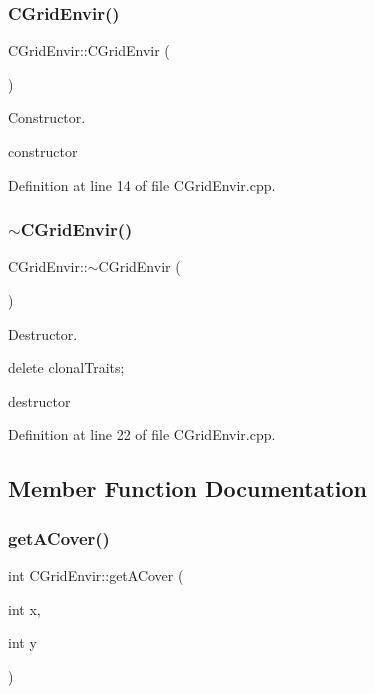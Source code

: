 \subsubsection{\texorpdfstring{CGridEnvir()}{CGridEnvir()}}
{\footnotesize\ttfamily C\+Grid\+Envir\+::\+C\+Grid\+Envir (\begin{DoxyParamCaption}{ }\end{DoxyParamCaption})}



Constructor. 

constructor 

Definition at line 14 of file C\+Grid\+Envir.\+cpp.

\mbox{\label{class_c_grid_envir_a825ef1eb30d856e0ecee1f429a202314}} 
\subsubsection{\texorpdfstring{$\sim$CGridEnvir()}{~CGridEnvir()}}
{\footnotesize\ttfamily C\+Grid\+Envir\+::$\sim$\+C\+Grid\+Envir (\begin{DoxyParamCaption}{ }\end{DoxyParamCaption})\hspace{0.3cm}{\ttfamily [virtual]}}



Destructor. 

delete clonal\+Traits;

destructor 

Definition at line 22 of file C\+Grid\+Envir.\+cpp.



\subsection{Member Function Documentation}
\mbox{\label{class_c_grid_envir_a73e33cf0609fdd81d5b7e04ca7a02f12}} 
\subsubsection{\texorpdfstring{getACover()}{getACover()}}
{\footnotesize\ttfamily int C\+Grid\+Envir\+::get\+A\+Cover (\begin{DoxyParamCaption}\item[{int}]{x,  }\item[{int}]{y }\end{DoxyParamCaption})}

